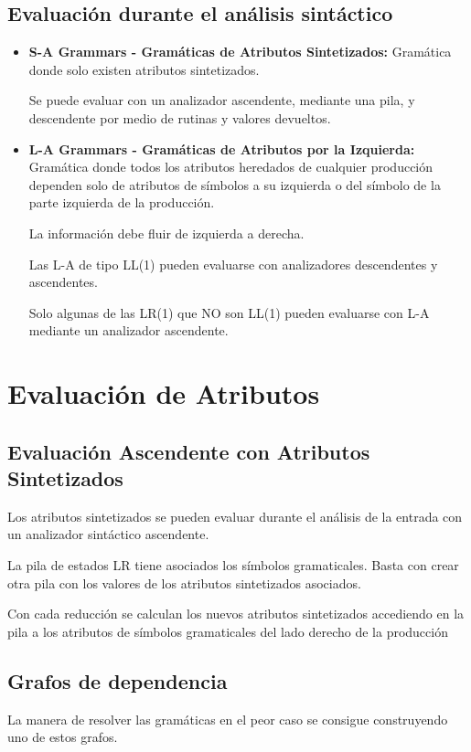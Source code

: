 \documentclass[12pt, twoside, openright]{report} %
\begin{document}
\subsection{Evaluación durante el análisis sintáctico}
\begin{itemize}
  \item \textbf{S-A Grammars - Gramáticas de Atributos Sintetizados:} Gramática donde solo existen atributos sintetizados.
  
  Se puede evaluar con un analizador ascendente, mediante una pila, y descendente por medio de rutinas y valores devueltos.
  \item \textbf{L-A Grammars - Gramáticas de Atributos por la Izquierda:} Gramática donde todos los atributos heredados de cualquier producción dependen solo de atributos de símbolos a su izquierda o del símbolo de la parte izquierda de la producción.
  
  La información debe fluir de izquierda a derecha.

  Las L-A de tipo LL(1) pueden evaluarse con analizadores descendentes y ascendentes.

  Solo algunas de las LR(1) que NO son LL(1) pueden evaluarse con L-A mediante un analizador ascendente.
\end{itemize}
\pagebreak
\section{Evaluación de Atributos}
\subsection{Evaluación Ascendente con Atributos Sintetizados}
Los atributos sintetizados se pueden evaluar durante el análisis de la entrada con un analizador sintáctico ascendente.

La pila de estados LR tiene asociados los símbolos gramaticales.
Basta con crear otra pila con los valores de los atributos sintetizados asociados.

Con cada reducción se calculan los nuevos atributos sintetizados accediendo en la pila a los atributos de símbolos gramaticales del lado derecho de la producción

\subsection{Grafos de dependencia}
La manera de resolver las gramáticas en el peor caso se consigue construyendo uno de estos grafos.
\end{document}
